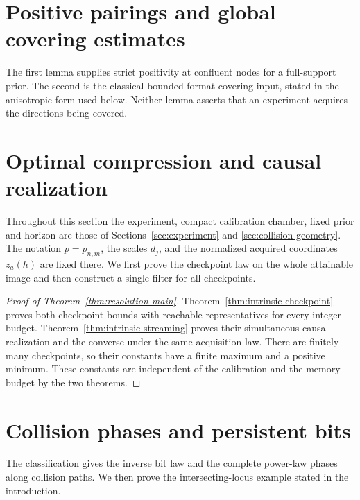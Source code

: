 \section{Positive pairings and global covering estimates}\label{sec:analytic-inputs}
The first lemma supplies strict positivity at confluent nodes for a
full-support prior. The second is the classical bounded-format
covering input, stated in the anisotropic form used below. Neither
lemma asserts that an experiment acquires the directions being covered.


\section{Optimal compression and causal realization}\label{sec:direct-classification}
Throughout this section the experiment, compact calibration chamber,
fixed prior and horizon are those of Sections~\ref{sec:experiment} and
\ref{sec:collision-geometry}. The notation $p=p_{n,m}$, the scales
$d_j$, and the normalized acquired coordinates $z_a(h)$ are fixed there.
We first prove the checkpoint law on the whole attainable image and
then construct a single filter for all checkpoints.

\begin{proof}[Proof of Theorem~\ref{thm:resolution-main}]
Theorem~\ref{thm:intrinsic-checkpoint} proves both checkpoint bounds
with reachable representatives for every integer budget.
Theorem~\ref{thm:intrinsic-streaming} proves their simultaneous causal
realization and the converse under the same acquisition law. There
are finitely many checkpoints, so their constants have a finite
maximum and a positive minimum. These constants are independent of
the calibration and the memory budget by the two theorems.
\end{proof}
\section{Collision phases and persistent bits}\label{sec:collision-phases}
The classification gives the inverse bit law and the complete power-law
phases along collision paths. We then prove the intersecting-locus
example stated in the introduction.






